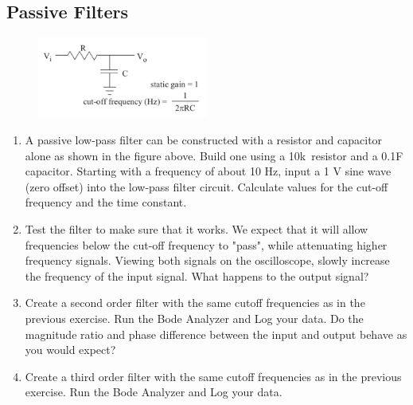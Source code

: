 \documentclass{article}
\begin{document}
\subsection*{Passive Filters}
\begin{figure}[h]
    	\includegraphics[width=0.5\textwidth]{lab_1_fig_3.jpg}
    	\centering
		\end{figure}
		
\begin{enumerate}
	\item A passive low-pass filter can be constructed with a resistor and capacitor alone as shown in the figure above. Build one using a 10k\textOmega\ resistor and a 0.1\textmu F capacitor. Starting with a frequency of about 10 Hz, input a 1 V sine wave (zero offset) into the low-pass filter circuit. Calculate values for the cut-off frequency and the time constant.
	\item Test the filter to make sure that it works. We expect that it will allow frequencies below the cut-off frequency to "pass", while attenuating higher frequency signals. Viewing both signals on the oscilloscope, slowly increase the frequency of the input signal. What happens to the output signal?
	\item Create a second order filter with the same cutoff frequencies as in the previous exercise. Run the Bode Analyzer and Log your data. Do the magnitude ratio and phase difference between the input and output behave as you would expect?
	\item Create a third order filter with the same cutoff frequencies as in the previous exercise. Run the Bode Analyzer and Log your data.
\end{enumerate}
\end{document}
